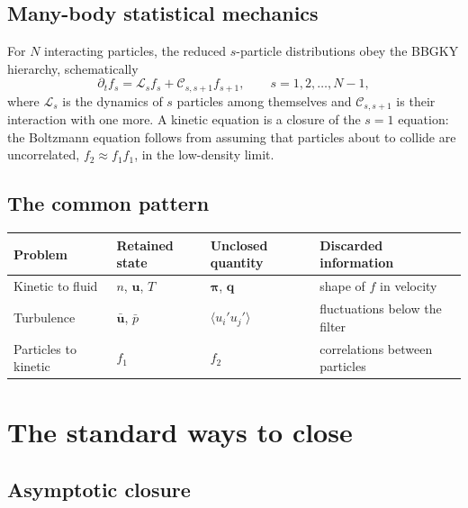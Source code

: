 \documentclass[11pt]{article}
\newcommand{\avg}[1]{\langle #1 \rangle}
\newcommand{\bu}{\mathbf{u}}
\newcommand{\bq}{\mathbf{q}}
\begin{document}
\subsection{Many-body statistical mechanics}

For $N$ interacting particles, the reduced $s$-particle distributions obey
the BBGKY hierarchy, schematically
\begin{equation}
  \partial_t f_s = \mathcal{L}_s f_s + \mathcal{C}_{s,s+1} f_{s+1},
  \qquad s = 1, 2, \dots, N-1,
\end{equation}
where $\mathcal{L}_s$ is the dynamics of $s$ particles among themselves and
$\mathcal{C}_{s,s+1}$ is their interaction with one more. A kinetic equation
is a closure of the $s=1$ equation: the Boltzmann equation follows from
assuming that particles about to collide are uncorrelated,
$f_2 \approx f_1 f_1$, in the low-density limit.

\subsection{The common pattern}

\begin{center}
\renewcommand{\arraystretch}{1.4}
\begin{tabular}{>{\raggedright}p{3.2cm}>{\raggedright}p{3.6cm}>{\raggedright}p{3.4cm}p{3.6cm}}
  Problem & Retained state & Unclosed quantity & Discarded information \\ \hline
  Kinetic to fluid & $n$, $\bu$, $T$ & $\boldsymbol{\pi}$, $\bq$
     & shape of $f$ in velocity \\
  Turbulence & $\bar{\bu}$, $\bar p$ & $\avg{u_i'u_j'}$
     & fluctuations below the filter \\
  Particles to kinetic & $f_1$ & $f_2$ & correlations between particles \\
\end{tabular}
\end{center}

\section{The standard ways to close}

\subsection{Asymptotic closure}
\end{document}
